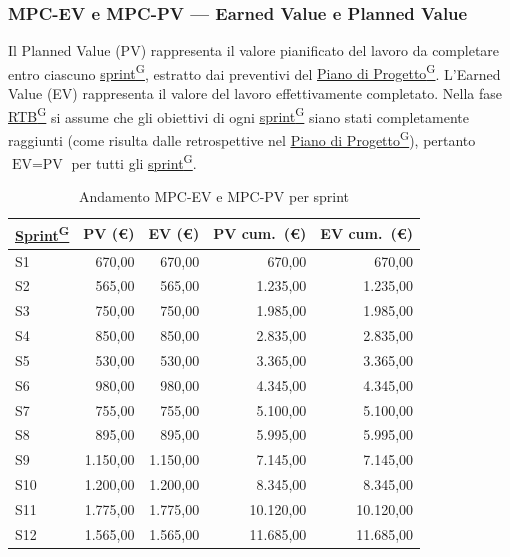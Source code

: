 \documentclass[a4paper,12pt]{article}
\providecommand{\glslink}[2]{\href{https://alittlebyte-19.github.io/Documentazione/glossario.html\#gls-#1}{\underline{#2}\textsuperscript{\scriptsize G}}}
\begin{document}
\subsubsection{MPC-EV e MPC-PV — Earned Value e Planned Value}

Il Planned Value (PV) rappresenta il valore pianificato del lavoro da completare entro ciascuno \glslink{sprint}{sprint}, estratto dai preventivi del \glslink{piano-di-progetto}{Piano di Progetto}. L'Earned Value (EV) rappresenta il valore del lavoro effettivamente completato. Nella fase \glslink{rtb-requirements-and-technology-baseline}{RTB} si assume che gli obiettivi di ogni \glslink{sprint}{sprint} siano stati completamente raggiunti (come risulta dalle retrospettive nel \glslink{piano-di-progetto}{Piano di Progetto}), pertanto $\text{EV} = \text{PV}$ per tutti gli \glslink{sprint}{sprint}.

\begin{table}[H]
\centering
{}
\begin{tabular}{|l|r|r|r|r|}
    \hline
    \rowcolor{gray!35}
    \textbf{\glslink{sprint}{Sprint}} & \textbf{PV (\euro)} & \textbf{EV (\euro)} & \textbf{PV cum.\ (\euro)} & \textbf{EV cum.\ (\euro)} \\
    \hline
    S1 & 670,00  & 670,00  & 670,00  & 670,00  \\
    S2 & 565,00  & 565,00  & 1.235,00 & 1.235,00 \\
    S3 & 750,00  & 750,00  & 1.985,00 & 1.985,00 \\
    S4 & 850,00  & 850,00  & 2.835,00 & 2.835,00 \\
    S5 & 530,00  & 530,00  & 3.365,00 & 3.365,00 \\
    S6 & 980,00  & 980,00  & 4.345,00 & 4.345,00 \\
    S7 & 755,00  & 755,00  & 5.100,00 & 5.100,00 \\
    S8 & 895,00  & 895,00  & 5.995,00 & 5.995,00 \\
    S9 & 1.150,00 & 1.150,00 & 7.145,00 & 7.145,00 \\
    S10 & 1.200,00 & 1.200,00 & 8.345,00 & 8.345,00 \\
    S11 & 1.775,00 & 1.775,00 & 10.120,00 & 10.120,00 \\
    S12 & 1.565,00 & 1.565,00 & 11.685,00 & 11.685,00 \\
    \hline
\end{tabular}
\caption{Andamento MPC-EV e MPC-PV per sprint}
\end{table}
\end{document}
